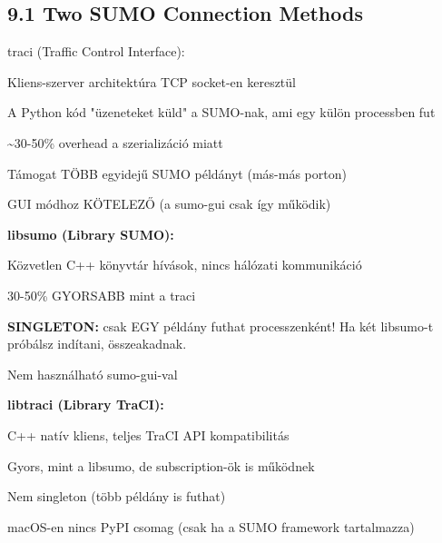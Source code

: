 \documentclass[11pt,a4paper]{article}
\begin{document}
\subsection*{9.1 Two SUMO Connection Methods}
traci (Traffic Control Interface):
\par\noindent\hspace*{1em}\textbullet{} Kliens-szerver architektúra TCP socket-en keresztül
\par\noindent\hspace*{1em}\textbullet{} A Python kód "üzeneteket küld" a SUMO-nak, ami egy külön processben fut
\par\noindent\hspace*{1em}\textbullet{} \textasciitilde{}30-50\% overhead a szerializáció miatt
\par\noindent\hspace*{1em}\textbullet{} Támogat TÖBB egyidejű SUMO példányt (más-más porton)
\par\noindent\hspace*{1em}\textbullet{} GUI módhoz KÖTELEZŐ (a sumo-gui csak így működik)

\textbf{libsumo (Library SUMO):}
\par\noindent\hspace*{1em}\textbullet{} Közvetlen C++ könyvtár hívások, nincs hálózati kommunikáció
\par\noindent\hspace*{1em}\textbullet{} 30-50\% GYORSABB mint a traci
\par\noindent\hspace*{1em}\textbullet{} \textbf{SINGLETON:} csak EGY példány futhat processzenként!
Ha két libsumo-t próbálsz indítani, összeakadnak.
\par\noindent\hspace*{1em}\textbullet{} Nem használható sumo-gui-val

\textbf{libtraci (Library TraCI):}
\par\noindent\hspace*{1em}\textbullet{} C++ natív kliens, teljes TraCI API kompatibilitás
\par\noindent\hspace*{1em}\textbullet{} Gyors, mint a libsumo, de subscription-ök is működnek
\par\noindent\hspace*{1em}\textbullet{} Nem singleton (több példány is futhat)
\par\noindent\hspace*{1em}\textbullet{} macOS-en nincs PyPI csomag (csak ha a SUMO framework tartalmazza)
\end{document}
